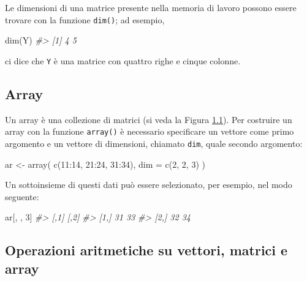 \documentclass[
  11pt,
]{krantz}
\makeatletter
\newenvironment{Shaded}{\begin{snugshade}}{\end{snugshade}}
\newcommand{\AttributeTok}[1]{\textcolor[rgb]{0.61,0.61,0.61}{#1}}
\newcommand{\CommentTok}[1]{\textcolor[rgb]{0.37,0.37,0.37}{\textit{#1}}}
\newcommand{\DecValTok}[1]{\textcolor[rgb]{0.06,0.06,0.06}{#1}}
\newcommand{\FunctionTok}[1]{\textcolor[rgb]{0,0,0}{#1}}
\newcommand{\NormalTok}[1]{#1}
\newcommand{\OtherTok}[1]{\textcolor[rgb]{0.37,0.37,0.37}{#1}}
\newcommand{\SpecialCharTok}[1]{\textcolor[rgb]{0,0,0}{#1}}
\newenvironment{kframe}{%
\medskip{}
\setlength{\fboxsep}{.8em}
 \def\at@end@of@kframe{}%
 \ifinner\ifhmode%
  \def\at@end@of@kframe{\end{minipage}}%
  \begin{minipage}{\columnwidth}%
 \fi\fi%
 \def\FrameCommand##1{\hskip\@totalleftmargin \hskip-\fboxsep
 \colorbox{shadecolor}{##1}\hskip-\fboxsep
     \hskip-\linewidth \hskip-\@totalleftmargin \hskip\columnwidth}%
 \MakeFramed {\advance\hsize-\width
   \@totalleftmargin\z@ \linewidth\hsize
   \@setminipage}}%
 {\par\unskip\endMakeFramed%
 \at@end@of@kframe}
\renewenvironment{Shaded}{\begin{kframe}}{\end{kframe}}
\theoremstyle{definition}
\theoremstyle{definition}
\theoremstyle{definition}
\theoremstyle{definition}
\theoremstyle{remark}
\makeatother
\begin{document}
Le dimensioni di una matrice presente nella memoria di lavoro possono essere trovare con la funzione \texttt{dim()}; ad esempio,

\begin{Shaded}
\begin{Highlighting}[]
\FunctionTok{dim}\NormalTok{(Y)}
\CommentTok{\#\textgreater{} [1] 4 5}
\end{Highlighting}
\end{Shaded}

ci dice che \texttt{Y} è una matrice con quattro righe e cinque colonne.

\hypertarget{array}{%
\subsection{Array}\label{array}}

Un array è una collezione di matrici (si veda la Figura \protect\hyperlink{fig:R_data_structures}{1.1}). Per costruire un array con la funzione \texttt{array()} è necessario specificare un vettore come primo argomento e un vettore di dimensioni, chiamato \texttt{dim}, quale secondo argomento:

\begin{Shaded}
\begin{Highlighting}[]
\NormalTok{ar }\OtherTok{\textless{}{-}} \FunctionTok{array}\NormalTok{(}
  \FunctionTok{c}\NormalTok{(}\DecValTok{11}\SpecialCharTok{:}\DecValTok{14}\NormalTok{, }\DecValTok{21}\SpecialCharTok{:}\DecValTok{24}\NormalTok{, }\DecValTok{31}\SpecialCharTok{:}\DecValTok{34}\NormalTok{), }
  \AttributeTok{dim =} \FunctionTok{c}\NormalTok{(}\DecValTok{2}\NormalTok{, }\DecValTok{2}\NormalTok{, }\DecValTok{3}\NormalTok{)}
\NormalTok{)}
\end{Highlighting}
\end{Shaded}

Un sottoinsieme di questi dati può essere selezionato, per esempio, nel modo seguente:

\begin{Shaded}
\begin{Highlighting}[]
\NormalTok{ar[, , }\DecValTok{3}\NormalTok{]}
\CommentTok{\#\textgreater{}      [,1] [,2]}
\CommentTok{\#\textgreater{} [1,]   31   33}
\CommentTok{\#\textgreater{} [2,]   32   34}
\end{Highlighting}
\end{Shaded}

\hypertarget{operazioni-aritmetiche-su-vettori-matrici-e-array}{%
\subsection{Operazioni aritmetiche su vettori, matrici e array}\label{operazioni-aritmetiche-su-vettori-matrici-e-array}}
\end{document}
